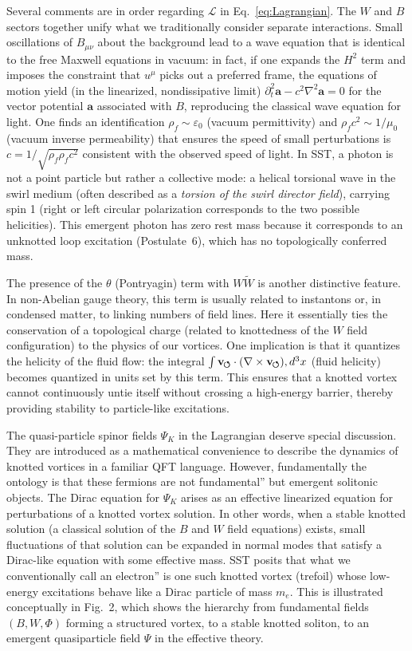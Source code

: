 \documentclass[10pt,reprint,aps,onecolumn,nofootinbib]{revtex4-2}
\newcommand{\swirlarrow}{%
    \mathchoice{\mkern-2mu\scriptstyle\boldsymbol{\circlearrowleft}}%
    {\mkern-2mu\scriptstyle\boldsymbol{\circlearrowleft}}%
    {\mkern-2mu\scriptstyle\boldsymbol{\circlearrowleft}}%
    {\mkern-2mu\scriptscriptstyle\boldsymbol{\circlearrowleft}}%
}
\newcommand{\vswirl}{\mathbf{v}_{\swirlarrow}}
\newcommand{\rhoF}{\rho_{\!f}}     %
\begin{document}
Several comments are in order regarding $\mathcal{L}$ in Eq.~\eqref{eq:Lagrangian}. The $W$ and $B$ sectors together unify what we traditionally consider separate interactions. Small oscillations of $B_{\mu\nu}$ about the background lead to a wave equation that is identical to the free Maxwell equations in vacuum: in fact, if one expands the $H^2$ term and imposes the constraint that $u^\mu$ picks out a preferred frame, the equations of motion yield (in the linearized, nondissipative limit) $\partial_t^2 \mathbf{a} - c^2 \nabla^2 \mathbf{a} = 0$ for the vector potential $\mathbf{a}$ associated with $B$, reproducing the classical wave equation for light. One finds an identification $\rhoF \sim \varepsilon_0$ (vacuum permittivity) and $\rhoF c^2 \sim 1/\mu_0$ (vacuum inverse permeability) that ensures the speed of small perturbations is $c = 1/\sqrt{\rhoF \rhoF c^2}$ consistent with the observed speed of light. In SST, a photon is not a point particle but rather a collective mode: a helical torsional wave in the swirl medium (often described as a \emph{torsion of the swirl director field}), carrying spin 1 (right or left circular polarization corresponds to the two possible helicities). This emergent photon has zero rest mass because it corresponds to an unknotted loop excitation (Postulate~6), which has no topologically conferred mass.


The presence of the $\theta$ (Pontryagin) term with $W\tilde{W}$ is another distinctive feature. In non-Abelian gauge theory, this term is usually related to instantons or, in condensed matter, to linking numbers of field lines. Here it essentially ties the conservation of a topological charge (related to knottedness of the $W$ field configuration) to the physics of our vortices. One implication is that it quantizes the helicity of the fluid flow: the integral $\int \vswirl \cdot (\nabla \times \vswirl) , d^3x$ (fluid helicity) becomes quantized in units set by this term. This ensures that a knotted vortex cannot continuously untie itself without crossing a high-energy barrier, thereby providing stability to particle-like excitations.


The quasi-particle spinor fields $\Psi_K$ in the Lagrangian deserve special discussion. They are introduced as a mathematical convenience to describe the dynamics of knotted vortices in a familiar QFT language. However, fundamentally the ontology is that these fermions are not fundamental'' but emergent solitonic objects. The Dirac equation for $\Psi_K$ arises as an effective linearized equation for perturbations of a knotted vortex solution. In other words, when a stable knotted solution (a classical solution of the $B$ and $W$ field equations) exists, small fluctuations of that solution can be expanded in normal modes that satisfy a Dirac-like equation with some effective mass. SST posits that what we conventionally call an electron'' is one such knotted vortex (trefoil) whose low-energy excitations behave like a Dirac particle of mass $m_e$. This is illustrated conceptually in Fig.~2, which shows the hierarchy from fundamental fields $(B, W, \Phi)$ forming a structured vortex, to a stable knotted soliton, to an emergent quasiparticle field $\Psi$ in the effective theory.
\end{document}
